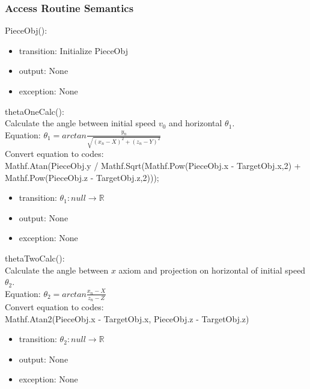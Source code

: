\documentclass[12pt, titlepage]{article}
\begin{document}
\subsubsection{Access Routine Semantics}

\noindent PieceObj():
\begin{itemize}
	\item transition: Initialize PieceObj
	\item output: None
	\item exception: None
\end{itemize}

\noindent thetaOneCalc(): \\
Calculate the angle between initial speed $v_{0}$ and horizontal $\theta_{1}$. \\
Equation: $\theta_{1}=arctan \frac{y_{n}}{\sqrt{(x_{n}-X)^2+(z_{n}-Y)^2}}$\\
Convert equation to codes:\\
Mathf.Atan(PieceObj.y / Mathf.Sqrt(Mathf.Pow(PieceObj.x - TargetObj.x,2) +
Mathf.Pow(PieceObj.z - TargetObj.z,2))); 
\begin{itemize}
	\item transition: $\theta_{1}: null \to \mathbb{R}$   
	\item output: None
	\item exception: None
\end{itemize}

\noindent thetaTwoCalc():\\
Calculate the angle between $x$ axiom and projection on horizontal of initial speed $\theta_{2}$.\\
Equation: $\theta_{2}=arctan \frac{x_{n}-X}{z_{n}-Z}$\\
Convert equation to codes:\\
Mathf.Atan2(PieceObj.x - TargetObj.x, PieceObj.z - TargetObj.z)
\begin{itemize}
	\item transition: $\theta_{2}: null \to \mathbb{R}$  
	\item output: None
	\item exception: None
\end{itemize}
\end{document}
